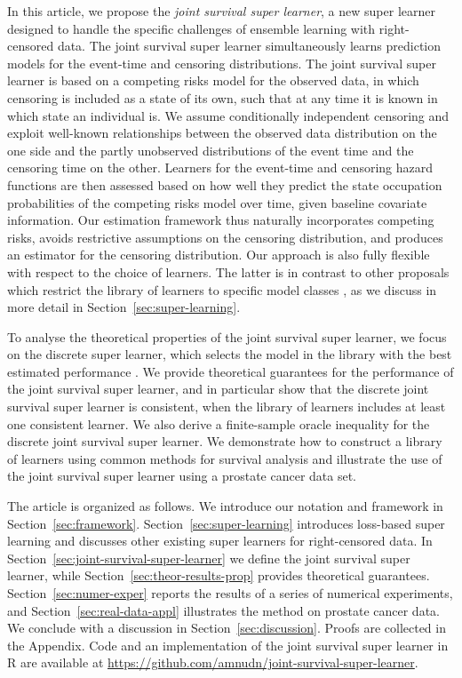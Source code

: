 \documentclass[lineno]{biometrika}
\newcommand{\1}{\mathds{1}}
\begin{document}
In this article, we propose the {\it joint survival super learner}, a
new super learner designed to handle the specific challenges of
ensemble learning with right-censored data. The joint survival super
learner simultaneously learns prediction models for the event-time and
censoring distributions. The joint survival super learner is based on
a competing risks model for the observed data, in which censoring is
included as a state of its own, such that at any time it is known in
which state an individual is. We assume conditionally independent
censoring and exploit well-known relationships between the observed
data distribution on the one side and the partly unobserved distributions of the event
time and the censoring time on the other. Learners for the event-time
and censoring hazard functions are then assessed based on how well
they predict the state occupation probabilities of the competing risks
model over time, given baseline covariate information. Our estimation
framework thus naturally incorporates competing risks, avoids
restrictive assumptions on the censoring distribution, and produces an
estimator for the censoring distribution. Our approach is also fully
flexible with respect to the choice of learners. The latter is in
contrast to other proposals which restrict the library of learners to
specific model classes \citep{polley2011-sl-cens,golmakani2020super},
as we discuss in more detail in Section~\ref{sec:super-learning}.

To analyse the theoretical properties of the joint survival super
learner, we focus on the discrete super learner, which selects the
model in the library with the best estimated performance
\citep{van2007super}. We provide theoretical guarantees for the
performance of the joint survival super learner, and in particular
show that the discrete joint survival super learner is consistent,
when the library of learners includes at least one consistent
learner. We also derive a finite-sample oracle inequality for the
discrete joint survival super learner. We demonstrate how to construct
a library of learners using common methods for survival analysis and
illustrate the use of the joint survival super learner using a
prostate cancer data set.

The article is organized as follows. We introduce our notation and
framework in Section~\ref{sec:framework}.
Section~\ref{sec:super-learning} introduces loss-based super learning
and discusses other existing super learners for right-censored
data. In Section~\ref{sec:joint-survival-super-learner} we define the joint
survival super learner, while Section~\ref{sec:theor-results-prop}
provides theoretical guarantees. Section~\ref{sec:numer-exper} reports
the results of a series of numerical experiments, and
Section~\ref{sec:real-data-appl} illustrates the method on prostate
cancer data. We conclude with a discussion in
Section~\ref{sec:discussion}. Proofs are collected in the
Appendix. Code and an implementation of the joint survival super
learner in R \citep{R} are available at
\url{https://github.com/amnudn/joint-survival-super-learner}.
\end{document}

